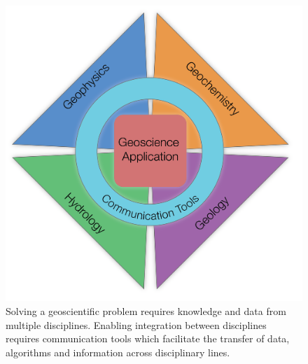 \begin{figure}
    \begin{center}
    \includegraphics[width=0.55\columnwidth]{figures/multidisciplinary.png}
    \end{center}
\caption{
    Solving a geoscientific problem requires knowledge and data from multiple disciplines. Enabling integration between disciplines requires communication tools which facilitate the transfer of data, algorithms and information across disciplinary lines.
}
\label{fig:multidisciplinary}
\end{figure}
